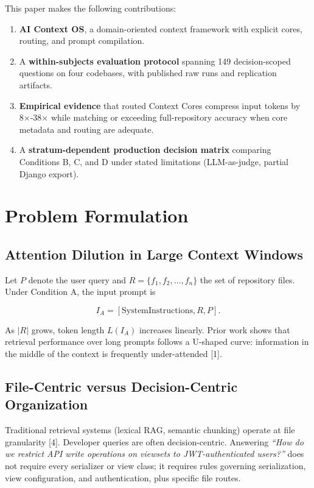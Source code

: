 \documentclass[11pt]{article}
\providecommand{\tightlist}{%
  \setlength{\itemsep}{2pt}%
  \setlength{\parskip}{0pt}%
}
\begin{document}
This paper makes the following contributions:

\begin{enumerate}
\def\labelenumi{\arabic{enumi}.}
\tightlist
\item
  \textbf{AI Context OS}, a domain-oriented context framework with
  explicit cores, routing, and prompt compilation.
\item
  A \textbf{within-subjects evaluation protocol} spanning 149
  decision-scoped questions on four codebases, with published raw runs
  and replication artifacts.
\item
  \textbf{Empirical evidence} that routed Context Cores compress input
  tokens by 8×-38× while matching or exceeding full-repository accuracy
  when core metadata and routing are adequate.
\item
  A \textbf{stratum-dependent production decision matrix} comparing
  Conditions B, C, and D under stated limitations (LLM-as-judge, partial
  Django export).
\end{enumerate}

\section{Problem Formulation}\label{problem-formulation}

\subsection{Attention Dilution in Large Context
Windows}\label{attention-dilution-in-large-context-windows}

Let \(P\) denote the user query and \(R = \{f_1, f_2, \dots, f_n\}\) the
set of repository files. Under Condition A, the input prompt is

\[I_A = [\text{SystemInstructions}, R, P].\]

As \(|R|\) grows, token length \(L(I_A)\) increases linearly. Prior work
shows that retrieval performance over long prompts follows a U-shaped
curve: information in the middle of the context is frequently
under-attended {[}1{]}.

\subsection{File-Centric versus Decision-Centric
Organization}\label{file-centric-versus-decision-centric-organization}

Traditional retrieval systems (lexical RAG, semantic chunking) operate
at file granularity {[}4{]}. Developer queries are often
decision-centric. Answering \emph{``How do we restrict API write
operations on viewsets to JWT-authenticated users?''} does not require
every serializer or view class; it requires rules governing
serialization, view configuration, and authentication, plus specific
file routes.
\end{document}

